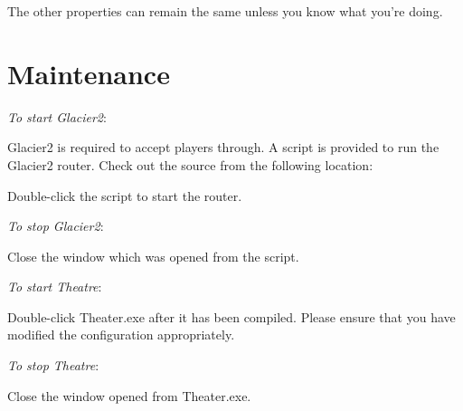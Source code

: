 The other properties can remain the same unless you know what you're doing.

\section{Maintenance}

\emph{To start Glacier2}:

Glacier2 is required to accept players through. A script is provided to run the Glacier2 router. Check out the source from the following location:


Double-click the  script to start the router.

\emph{To stop Glacier2}:

Close the window which was opened from the  script.

\emph{To start Theatre}:

Double-click Theater.exe after it has been compiled. Please ensure that you have modified the configuration appropriately.

\emph{To stop Theatre}:

Close the window opened from Theater.exe.